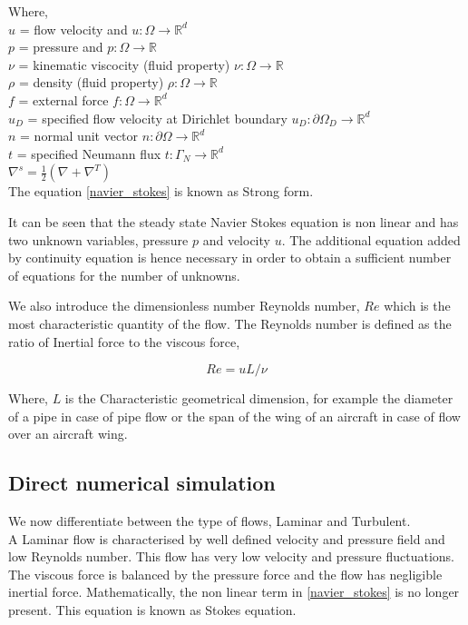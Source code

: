 \documentclass[a4paper,12pt]{book}
\begin{document}
Where,\\
$u$ = flow velocity and $u:\Omega \rightarrow \mathbb{R}^d$ \\
$p$ = pressure and $p:\Omega \rightarrow \mathbb{R}$\\
$\nu$ = kinematic viscocity (fluid property) $\nu:\Omega \rightarrow \mathbb{R}$\\ 
$\rho$ = density (fluid property) $\rho:\Omega \rightarrow \mathbb{R}$\\
$f$ = external force $f:\Omega \rightarrow \mathbb{R}^d$\\
$u_D$ = specified flow velocity at Dirichlet boundary $u_D:\partial \Omega_D \rightarrow \mathbb{R}^d$\\
$n$ = normal unit vector $n:\partial \Omega \rightarrow \mathbb{R}^d$\\
$t$ = specified Neumann flux $t:\Gamma_N \rightarrow \mathbb{R}^d$\\
$\nabla^s = \frac{1}{2}(\nabla + \nabla^T)$\\


The equation \eqref{navier_stokes} is known as Strong form.

It can be seen that the steady state Navier Stokes equation is non linear and has two unknown variables, pressure $p$ and velocity $u$. The additional equation added by continuity equation is hence necessary in order to obtain a sufficient number of equations for the number of unknowns.

We also introduce the dimensionless number Reynolds number, $Re$ which is the most characteristic quantity of the flow. The Reynolds number is defined as the ratio of Inertial force to the viscous force,

\begin{equation} \label{reynolds_number}
Re =  u L / \nu
\end{equation}

Where, $L$ is the Characteristic geometrical dimension, for example the diameter of a pipe in case of pipe flow or the span of the wing of an aircraft in case of flow over an aircraft wing.\\

\subsection{Direct numerical simulation} 

We now differentiate between the type of flows, Laminar and Turbulent.\\
A Laminar flow is characterised by well defined velocity and pressure field and low Reynolds number. This flow has very low velocity and pressure fluctuations. The viscous force is balanced by the pressure force and the flow has negligible inertial force. Mathematically, the non linear term in \eqref{navier_stokes} is no longer present. This equation is known as Stokes equation.\cite{white}\\
\end{document}
